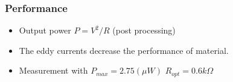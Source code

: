 \documentclass[compress]{beamer}
\begin{document}
\begin{frame}\frametitle{Performance}
\begin{itemize}[label=$\bullet$, font=\small, leftmargin=*]
\item Output power $P=V^2/R$ (post processing)
\item The eddy currents decrease the performance of material.
\item Measurement with $P_{max}=2.75(\mu W)$ $R_{opt}=0.6 k\Omega$
\end{itemize}
\end{frame}
\end{document}

